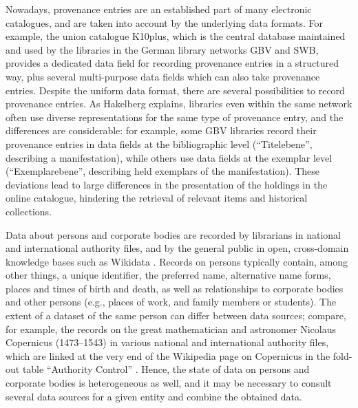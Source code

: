 Nowadays, provenance entries are an established part of 
many electronic catalogues,
and are taken into account by the underlying data formats.
For example, the union catalogue 
%
\gls{K10plus},
which is
the central database maintained and used by the libraries in the
%
%
German library networks \gls{GBV} and \gls{SWB},
provides a dedicated data field for recording provenance entries in a structured way,
plus several multi-purpose data fields which can also take provenance entries.
Despite the uniform data format,
there are several possibilities to record provenance entries.
As Hakelberg \autocite*[§4]{Hakelberg2016} explains,
libraries even within the same network often use diverse representations
for the same type of provenance entry, and the differences are considerable:
for example, some \gls{GBV} libraries record their provenance entries
in data fields at the bibliographic level (\enquote{Titelebene}, describing a manifestation),
while others use data fields at the exemplar level (\enquote{Exemplarebene}, describing held exemplars of the manifestation).
These deviations lead to large differences in the presentation
of the holdings in the online catalogue,
hindering the retrieval of relevant items and historical collections.

Data about persons and corporate bodies are recorded by librarians
in national and international authority files,
and by the general public 
in open, cross-domain knowledge bases such as Wikidata \autocite{Wikidata}.
Records on persons typically contain, among other things,
a unique identifier, the preferred name, alternative name forms,
places and times of birth and death,
as well as relationships to corporate bodies and other persons
(e.g., places of work, and family members or students).
The extent of a dataset of the same person can differ between data sources;
compare, for example, the records on the great mathematician and astronomer
Nicolaus Copernicus (1473--1543)
in various national and international authority files,
which are linked at the very end of the Wikipedia page on Copernicus
in the fold-out table \enquote{Authority Control}
\autocite{WikiCopernicusExternalLinks}.
Hence, the state of data on persons and corporate bodies is heterogeneous as well,
and it may be necessary
to consult several data sources for a given entity and combine the obtained data.

